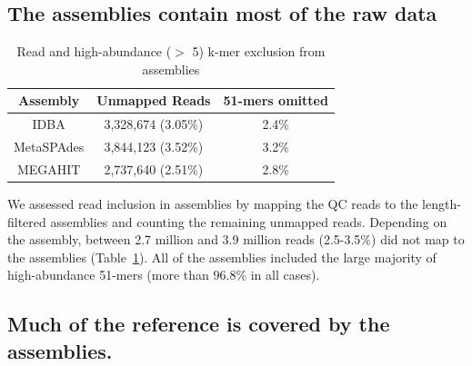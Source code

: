 \documentclass[11pt]{article}
\begin{document}

\subsection*{The assemblies contain most of the raw data}






\begin{table}[!h]
\centering
\caption{Read and high-abundance ($>$ 5) k-mer exclusion from assemblies}
\begin{tabular}{|c|c|c|}\hline
  \textbf{Assembly} & \textbf{Unmapped Reads} & \textbf {51-mers omitted}
  \\ \hline
IDBA &3,328,674 (3.05\%)&  2.4\% \\ \hline
MetaSPAdes &3,844,123 (3.52\%) &  3.2\% \\ \hline
MEGAHIT &2,737,640 (2.51\%) &   2.8\% \\ \hline
\end{tabular}
\label{table:reads-kmers}
\end{table}

We assessed read inclusion in assemblies by mapping the QC reads to
the length-filtered assemblies and counting the remaining unmapped
reads. Depending on the assembly, between 2.7 million and 3.9 million
reads (2.5-3.5\%) did not map to the assemblies
(Table~\ref{table:reads-kmers}).  All of the assemblies included the large
majority of high-abundance 51-mers (more than 96.8\% in all cases).

\subsection*{Much of the reference is covered by the assemblies.}

\end{document}
